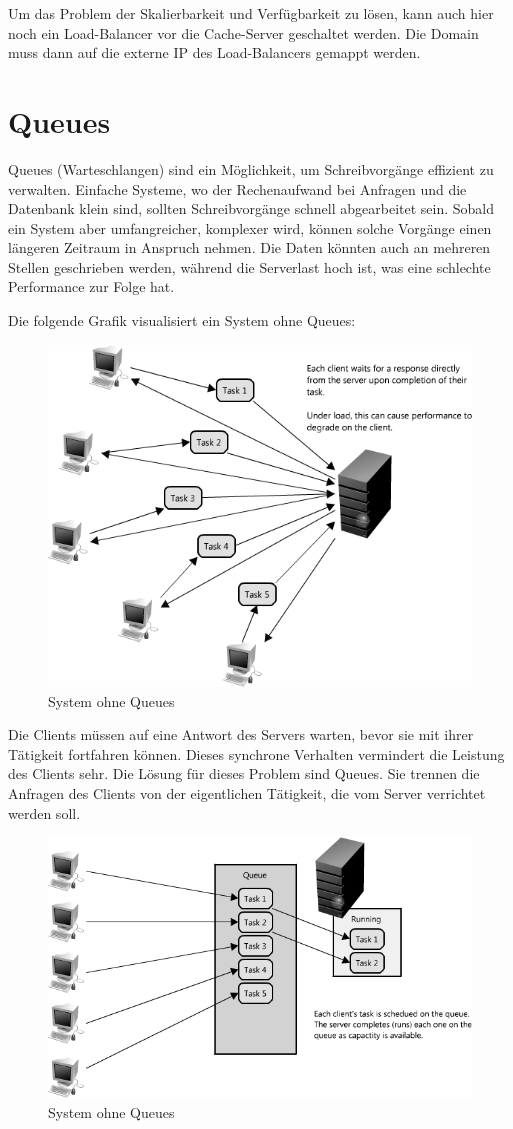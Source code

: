 Um das Problem der Skalierbarkeit und Verfügbarkeit zu lösen, kann auch hier noch ein Load-Balancer vor die Cache-Server geschaltet werden. Die Domain muss dann auf die externe IP des Load-Balancers gemappt werden.
\cite{LoadBalancing2}

\section{Queues}
\label{sec:Queues}
Queues (Warteschlangen) sind ein Möglichkeit, um Schreibvorgänge effizient zu verwalten. Einfache Systeme, wo der Rechenaufwand bei Anfragen und die Datenbank klein sind, sollten Schreibvorgänge schnell abgearbeitet sein. Sobald ein System aber umfangreicher, komplexer wird, können solche Vorgänge einen längeren Zeitraum in Anspruch nehmen. Die Daten könnten auch an mehreren Stellen geschrieben werden, während die Serverlast hoch ist, was eine schlechte Performance zur Folge hat.
\cite{Queues}

Die folgende Grafik visualisiert ein System ohne Queues:
\begin{figure}[!h]
	\begin{center}
		\includegraphics[width=0.5\linewidth]{images/synchronousRequest.png}
		\caption{System ohne Queues \cite{Queues}}
		\label{System_ohne_Queues}
	\end{center}
\end{figure}

Die Clients müssen auf eine Antwort des Servers warten, bevor sie mit ihrer Tätigkeit fortfahren können. Dieses synchrone Verhalten vermindert die Leistung des Clients sehr. Die Lösung für dieses Problem sind Queues. Sie trennen die Anfragen des Clients von der eigentlichen Tätigkeit, die vom Server verrichtet werden soll.

\begin{figure}[!h]
	\begin{center}
		\includegraphics[width=0.5\linewidth]{images/queues.png}
		\caption{System ohne Queues \cite{Queues}}
		\label{System_ohne_Queues}
	\end{center}
\end{figure}

